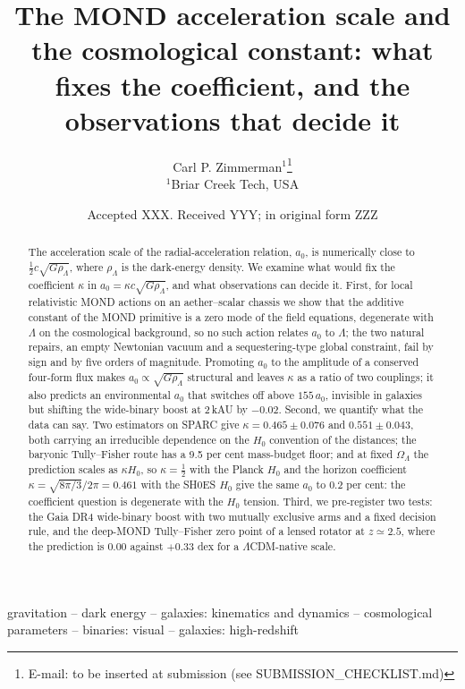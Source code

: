 \documentclass[fleqn,usenatbib]{mnras}
\title[The coefficient of the $a_0$--$\Lambda$ relation]{The MOND acceleration scale and the cosmological constant: what fixes the coefficient, and the observations that decide it}
\author[C. P. Zimmerman]{Carl P. Zimmerman$^{1}$\thanks{E-mail: to be inserted at submission (see SUBMISSION\_CHECKLIST.md)}
\\
$^{1}$Briar Creek Tech, USA}
\date{Accepted XXX. Received YYY; in original form ZZZ}
\begin{document}
\sloppy
\label{firstpage}
\pagerange{\pageref{firstpage}--\pageref{lastpage}}
\maketitle

\begin{abstract}
The acceleration scale of the radial-acceleration relation, $a_0$, is numerically close to $\tfrac12 c\sqrt{G\rho_\Lambda}$, where $\rho_\Lambda$ is the dark-energy density. We examine what would fix the coefficient $\kappa$ in $a_0=\kappa c\sqrt{G\rho_\Lambda}$, and what observations can decide it. First, for local relativistic MOND actions on an aether--scalar chassis we show that the additive constant of the MOND primitive is a zero mode of the field equations, degenerate with $\Lambda$ on the cosmological background, so no such action relates $a_0$ to $\Lambda$; the two natural repairs, an empty Newtonian vacuum and a sequestering-type global constraint, fail by sign and by five orders of magnitude. Promoting $a_0$ to the amplitude of a conserved four-form flux makes $a_0\propto\sqrt{G\rho_\Lambda}$ structural and leaves $\kappa$ as a ratio of two couplings; it also predicts an environmental $a_0$ that switches off above $155\,a_0$, invisible in galaxies but shifting the wide-binary boost at 2\,kAU by $-0.02$. Second, we quantify what the data can say. Two estimators on SPARC give $\kappa=0.465\pm0.076$ and $0.551\pm0.043$, both carrying an irreducible dependence on the $H_0$ convention of the distances; the baryonic Tully--Fisher route has a 9.5 per cent mass-budget floor; and at fixed $\Omega_\Lambda$ the prediction scales as $\kappa H_0$, so $\kappa=\tfrac12$ with the Planck $H_0$ and the horizon coefficient $\kappa=\sqrt{8\pi/3}/2\pi=0.461$ with the SH0ES $H_0$ give the same $a_0$ to 0.2 per cent: the coefficient question is degenerate with the $H_0$ tension. Third, we pre-register two tests: the Gaia DR4 wide-binary boost with two mutually exclusive arms and a fixed decision rule, and the deep-MOND Tully--Fisher zero point of a lensed rotator at $z\simeq2.5$, where the prediction is $0.00$ against $+0.33$ dex for a $\Lambda$CDM-native scale.
\end{abstract}

\begin{keywords}
gravitation -- dark energy -- galaxies: kinematics and dynamics -- cosmological parameters -- binaries: visual -- galaxies: high-redshift
\end{keywords}
\end{document}
